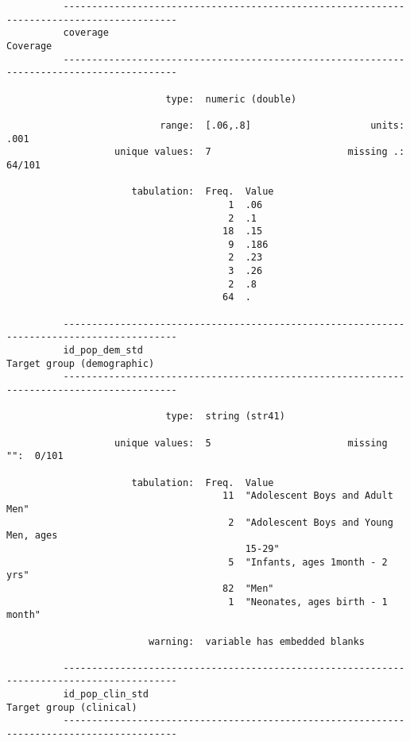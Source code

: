 \documentclass{article}
\begin{document}
\begin{verbatim}
          ------------------------------------------------------------------------------------------
          coverage                                                                          Coverage
          ------------------------------------------------------------------------------------------
          
                            type:  numeric (double)
          
                           range:  [.06,.8]                     units:  .001
                   unique values:  7                        missing .:  64/101
          
                      tabulation:  Freq.  Value
                                       1  .06
                                       2  .1
                                      18  .15
                                       9  .186
                                       2  .23
                                       3  .26
                                       2  .8
                                      64  .
          
          ------------------------------------------------------------------------------------------
          id_pop_dem_std                                                  Target group (demographic)
          ------------------------------------------------------------------------------------------
          
                            type:  string (str41)
          
                   unique values:  5                        missing "":  0/101
          
                      tabulation:  Freq.  Value
                                      11  "Adolescent Boys and Adult Men"
                                       2  "Adolescent Boys and Young Men, ages
                                          15-29"
                                       5  "Infants, ages 1month - 2 yrs"
                                      82  "Men"
                                       1  "Neonates, ages birth - 1 month"
          
                         warning:  variable has embedded blanks
          
          ------------------------------------------------------------------------------------------
          id_pop_clin_std                                                    Target group (clinical)
          ------------------------------------------------------------------------------------------
          

\end{verbatim}
\end{document}

